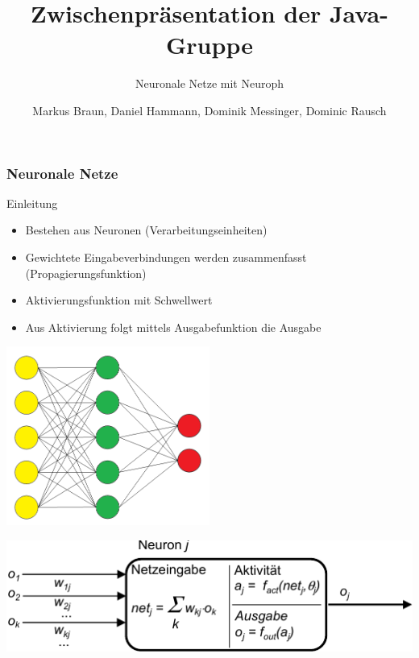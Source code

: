 \documentclass[18pt]{beamer}
\title{Zwischenpräsentation der Java-Gruppe}
\subtitle{Neuronale Netze mit Neuroph}
\author{Markus Braun, Daniel Hammann, Dominik Messinger, Dominic Rausch}
\institute{Institut für Programmstrukturen und Datenorganisation (IPD), Lehrstuhl für Programmiersysteme}
\begin{document}
	\maketitle

	\begin{frame}[c]\frametitle{Neuronale Netze}
		\begin{block}{Einleitung}
		    \begin{itemize}
			    \item Bestehen aus Neuronen (Verarbeitungseinheiten)
		    	\item Gewichtete Eingabeverbindungen werden zusammenfasst (Propagierungsfunktion)
		    	\item Aktivierungsfunktion mit Schwellwert
		    	\item Aus Aktivierung folgt mittels Ausgabefunktion die Ausgabe
		    \end{itemize}		    
		\end{block}	
		\vspace{.5cm}
			\begin{minipage}[c]{0.48\textwidth}
				\begin{center}
				\includegraphics[width=0.5\textwidth]{images/ann.png}
				\end{center}
			\end{minipage}	
			\begin{minipage}[c]{0.48\textwidth}
				\begin{center}
				\includegraphics[width=\textwidth]{images/Neuron}
				\end{center}
			\end{minipage}
	\end{frame}
	
\end{document}
